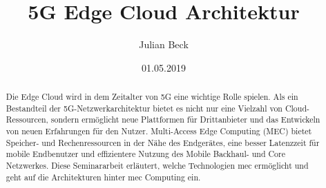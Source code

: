 \documentclass[runningheads]{llncs}
\title{5G Edge Cloud Architektur}
\author{Julian Beck}
\institute{Betreuer: Prof. Dr. rer. nat. Oliver Waldhorst}
\date{01.05.2019}
\numberwithin{figure}{section}
\begin{document}
\let\oldaddcontentsline\addcontentsline
\def\addcontentsline#1#2#3{}
\maketitle
\def\addcontentsline#1#2#3{\oldaddcontentsline{#1}{#2}{#3}}



\begin{abstract}
  Die Edge Cloud wird in dem Zeitalter von 5G eine wichtige Rolle spielen. 
  Als ein Bestandteil der 5G-Netzwerkarchitektur bietet es nicht nur eine Vielzahl von Cloud-Ressourcen, sondern
  ermöglicht neue Plattformen für Drittanbieter und das Entwickeln von neuen Erfahrungen für den Nutzer.
  Multi-Access Edge Computing (MEC) bietet Speicher- und Rechenressourcen in der Nähe des Endgerätes, 
  eine besser Latenzzeit für mobile Endbenutzer und effizientere Nutzung des Mobile Backhaul-
  und Core Netzwerkes. Diese Seminararbeit erläutert, welche Technologien \acrfull{mec} ermöglicht und geht auf die Architekturen 
  hinter \Acrshort{mec} Computing ein.
\end{abstract}

\tableofcontents 
\newpage
\printglossary[type=\acronymtype]
\newpage
\end{document}
